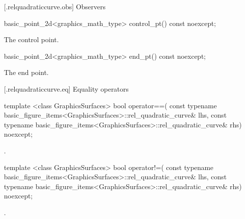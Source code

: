  [\iotwod.relquadraticcurve.obs] {Observers}

%
\begin{itemdecl}
basic_point_2d<graphics_math_type> control_pt() const noexcept;
\end{itemdecl}
\begin{itemdescr}
\pnum
\returns The control point.
\end{itemdescr}

%
\begin{itemdecl}
basic_point_2d<graphics_math_type> end_pt() const noexcept;
\end{itemdecl}
\begin{itemdescr}
\pnum
\returns The end point.
\end{itemdescr}

 [\iotwod.relquadraticcurve.eq] {Equality operators}%

%
\begin{itemdecl}
template <class GraphicsSurfaces>
bool operator==(
  const typename basic_figure_items<GraphicsSurfaces>::rel_quadratic_curve& lhs,
  const typename basic_figure_items<GraphicsSurfaces>::rel_quadratic_curve& rhs) 
  noexcept;
\end{itemdecl}
\begin{itemdescr}
\pnum
\returns
{}.
\end{itemdescr}

%
\begin{itemdecl}
template <class GraphicsSurfaces>
bool operator!=(
  const typename basic_figure_items<GraphicsSurfaces>::rel_quadratic_curve& lhs,
  const typename basic_figure_items<GraphicsSurfaces>::rel_quadratic_curve& rhs) 
  noexcept;
\end{itemdecl}
\begin{itemdescr}
\pnum
\returns
{}.
\end{itemdescr}
